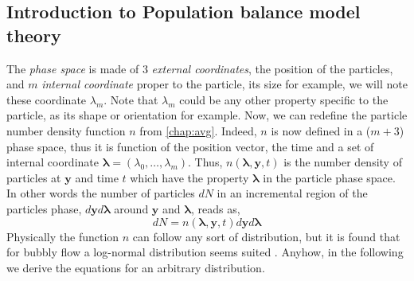 \subsection{Introduction to Population balance model theory}
The \textit{phase space} is made of 3 \textit{external coordinates}, the position  of the particles, and $m$ \textit{internal coordinate} proper to the particle, its size for example, we will note these coordinate $\lambda_m$.
Note that $\lambda_m$ could be any other property specific to the particle, as its shape or orientation for example.
Now, we can redefine the particle number density function $n$ from \ref{chap:avg}.
Indeed, $n$ is now defined in a ($m+3$) phase space, thus it is function of the position vector, the time and a set of internal coordinate $\bm{\lambda} = (\lambda_0,\ldots,\lambda_m)$.
Thus, $n(\mathcal{\bm{\lambda}},\bm{y},t)$ is the number density of particles at $\bm{y}$ and time $t$ which have the property $\bm{\lambda}$ in the particle phase space.
In other words the number of particles $dN$ in an incremental region of the particles phase, $d\bm{y}d\bm{\lambda} $ around $\bm{y}$ and $\bm{\lambda}$, reads as,
\begin{equation*}
    dN = n(\bm{\lambda},\bm{y},t) d\bm{y}d\bm{\lambda}
\end{equation*}
Physically the function $n$ can follow any sort of distribution, but it is found that for bubbly flow a log-normal distribution seems suited \citep{KAMP20011363}.
Anyhow, in the following we derive the equations for an arbitrary distribution.  


